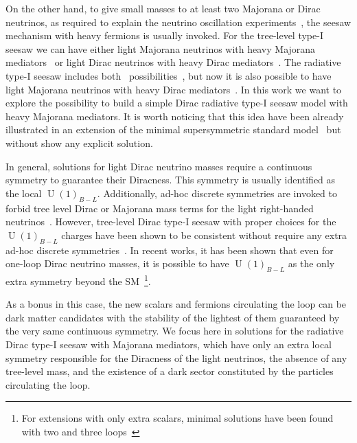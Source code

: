 \documentclass[12pt]{article}
\begin{document}
On the other hand, to give small masses to at least two Majorana or
Dirac neutrinos, as required to explain the neutrino oscillation
experiments~\cite{Ahmad:2002jz, Fukuda:1998mi},
the seesaw mechanism with heavy fermions is usually invoked.
For the tree-level type-I seesaw we can have either light Majorana
neutrinos with heavy Majorana
mediators~\cite{Minkowski:1977sc,Yanagida:1979as,GellMann:1980vs,Mohapatra:1979ia}
or light Dirac neutrinos with heavy Dirac
mediators~\cite{Roncadelli:1983ty,Roy:1983be,Gu:2007mc,Ma:2014qra}.
The radiative type-I seesaw includes both~\cite{Ma:2006km}
possibilities~\cite{Farzan:2012sa},
but now it is also possible to have light Majorana neutrinos with
heavy Dirac mediators~\cite{Ma:2013yga}.
In this work we want to explore the possibility to build a simple
Dirac radiative type-I seesaw model with heavy Majorana mediators.
It is worth noticing that this idea have been already illustrated in
an extension of the minimal supersymmetric standard
model~\cite{Demir:2007dt} but without show any explicit solution.

In general, solutions for light Dirac neutrino masses require a
continuous symmetry to guarantee their Diracness. This symmetry is
usually identified as the local $\operatorname{U}(1)_{B-L}$.
Additionally, ad-hoc discrete symmetries are invoked to forbid tree
level Dirac or Majorana mass terms for the light right-handed
neutrinos~\cite{Roncadelli:1983ty,Han:2018zcn,Wang:2017mcy}.
However, tree-level Dirac type-I seesaw with proper choices for the
$\operatorname{U}(1)_{B-L}$ charges have been shown to be consistent
without require any extra ad-hoc discrete symmetries~\cite{Ma:2014qra}.
In recent works, it has been shown that even for one-loop Dirac
neutrino masses, it is possible to have $\operatorname{U}(1)_{B-L}$ as
the only extra symmetry beyond the SM~\cite{Calle:2018ovc,Bonilla:2018ynb,Saad:2019bqf}\footnote{
  For extensions with only extra scalars, minimal solutions have been found with two and three loops~\cite{Saad:2019bqf}}.

As a bonus in this case, the new scalars and fermions circulating the
loop can be dark matter candidates with the stability of the lightest
of them guaranteed by the very same continuous symmetry.
We focus here in solutions for the radiative Dirac type-I seesaw with
Majorana mediators, which have only an extra local symmetry responsible for the
Diracness of the light neutrinos, the absence of any tree-level
mass, and the existence of a dark sector constituted by the
particles circulating the loop.
\end{document}
